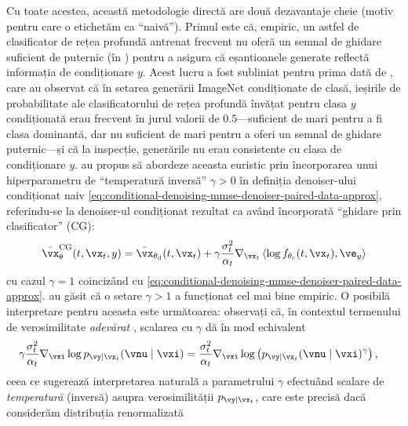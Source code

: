 \documentclass[../../book-main_ro.tex]{subfiles}
\begin{document}
Cu toate acestea, această metodologie directă are două dezavantaje cheie (motiv pentru care o
etichetăm ca ``naivă''). Primul este
că, empiric, un astfel de clasificator de rețea profundă antrenat frecvent nu
oferă un semnal de ghidare suficient de puternic (în
) pentru a asigura că
eșantioanele generate reflectă informația de condiționare $y$. Acest lucru a fost subliniat
pentru prima dată de \citet{Dhariwal2021-hg}, care au observat că în setarea
generării ImageNet condiționate de clasă, ieșirile de probabilitate ale clasificatorului
de rețea profundă învățat pentru clasa $y$ condiționată erau
frecvent în jurul valorii de
$0.5$---suficient de mari pentru a fi clasa dominantă, dar nu suficient de mari pentru a oferi
un semnal de ghidare puternic---și că la inspecție, generările nu erau
consistente cu clasa de condiționare $y$. \citet{Dhariwal2021-hg} au propus să
abordeze aceasta euristic prin încorporarea unui hiperparametru de ``temperatură inversă''
$\gamma > 0$
în definiția denoiser-ului condiționat naiv
\eqref{eq:conditional-denoising-mmse-denoiser-paired-data-approx}, referindu-se la
denoiser-ul condiționat rezultat ca având încorporată ``ghidare prin clasificator''
(CG):
\begin{equation}\label{eq:conditional-denoising-mmse-denoiser-paired-data-approx-cg}
  \bar{\vx}_{\theta}^{\mathrm{CG}}(t, \vx_t, y)
  =
  \bar{\vx}_{\theta_{\mathrm{d}}}(t, \vx_t)
  + \gamma\frac{\sigma_t^2}{\alpha_t}
  \nabla_{\vx_t}
  \ip*{
    \log f_{\theta_{\mathrm{c}}}(t, \vx_t)
  }{
    \ve_{y}
  }
\end{equation}
cu cazul $\gamma = 1$ coincizând cu
\eqref{eq:conditional-denoising-mmse-denoiser-paired-data-approx}.
\citet{Dhariwal2021-hg} au găsit că o setare $\gamma > 1$ a funcționat cel mai bine empiric.
O posibilă interpretare pentru aceasta este următoarea: observați că, în contextul
termenului de verosimilitate \textit{adevărat}
, scalarea cu $\gamma$
dă în mod echivalent
\begin{align}
  \gamma\frac{\sigma_t^2}{\alpha_t} \nabla_{\vxi}\log p_{\vy \mid \vx_t}(\vnu\mid
  \vxi)
  &=
  \frac{\sigma_t^2}{\alpha_t} \nabla_{\vxi}\log \left(
  p_{\vy \mid \vx_t}(\vnu\mid \vxi)^\gamma
  \right), %
\end{align}
ceea ce sugerează interpretarea naturală a parametrului $\gamma$ efectuând
scalare de \textit{temperatură} (inversă) asupra verosimilității
$p_{\vy \mid \vx_t}$, care este precisă dacă considerăm distribuția renormalizată
\end{document}
